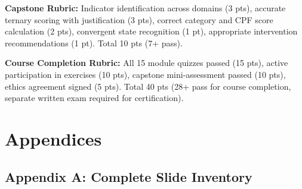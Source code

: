 \documentclass[11pt,a4paper]{article}
\begin{document}
\textbf{Capstone Rubric:} Indicator identification across domains (3 pts), accurate ternary scoring with justification (3 pts), correct category and CPF score calculation (2 pts), convergent state recognition (1 pt), appropriate intervention recommendations (1 pt). Total 10 pts (7+ pass).

\textbf{Course Completion Rubric:} All 15 module quizzes passed (15 pts), active participation in exercises (10 pts), capstone mini-assessment passed (10 pts), ethics agreement signed (5 pts). Total 40 pts (28+ pass for course completion, separate written exam required for certification).

\newpage

\section{Appendices}

\subsection{Appendix A: Complete Slide Inventory}
\end{document}
